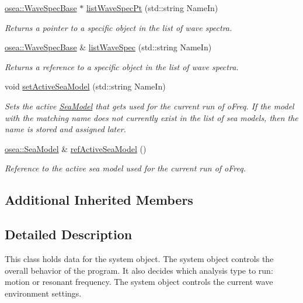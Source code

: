 \begin{DoxyCompactItemize}
\hyperlink{classosea_1_1_wave_spec_base}{osea\-::\-Wave\-Spec\-Base} $\ast$ \hyperlink{classosea_1_1ofreq_1_1_system_a69ff714ce0499574382106e57e1c37fb}{list\-Wave\-Spec\-Pt} (std\-::string Name\-In)
\begin{DoxyCompactList}\small\item\em Returns a pointer to a specific object in the list of wave spectra. \end{DoxyCompactList}\item 
\hyperlink{classosea_1_1_wave_spec_base}{osea\-::\-Wave\-Spec\-Base} \& \hyperlink{classosea_1_1ofreq_1_1_system_a6632d95e9c6e0080ca862e493284225f}{list\-Wave\-Spec} (std\-::string Name\-In)
\begin{DoxyCompactList}\small\item\em Returns a reference to a specific object in the list of wave spectra. \end{DoxyCompactList}\item 
void \hyperlink{classosea_1_1ofreq_1_1_system_ac5f72e0953e4bec43eee1ac2ad88be72}{set\-Active\-Sea\-Model} (std\-::string Name\-In)
\begin{DoxyCompactList}\small\item\em Sets the active \hyperlink{classosea_1_1_sea_model}{Sea\-Model} that gets used for the current run of o\-Freq. If the model with the matching name does not currently exist in the list of sea models, then the name is stored and assigned later. \end{DoxyCompactList}\item 
\hyperlink{classosea_1_1_sea_model}{osea\-::\-Sea\-Model} \& \hyperlink{classosea_1_1ofreq_1_1_system_afbbf0c020566cc024fffb01ee3674c50}{ref\-Active\-Sea\-Model} ()
\begin{DoxyCompactList}\small\item\em Reference to the active sea model used for the current run of o\-Freq. \end{DoxyCompactList}\end{DoxyCompactItemize}
\subsection*{Additional Inherited Members}


\subsection{Detailed Description}
This class holds data for the system object. The system object controls the overall behavior of the program. It also decides which analysis type to run\-: motion or resonant frequency. The system object controls the current wave environment settings. 

